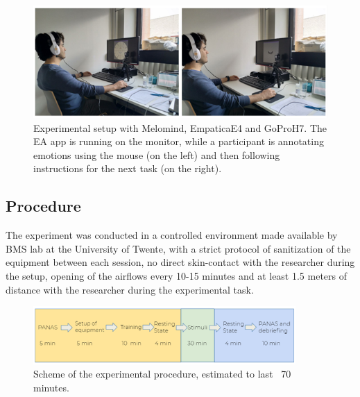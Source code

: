\begin{figure}[h!]
\includegraphics[width=14cm]{img/methods/experimental_setup.png}
\centering
\caption{Experimental setup with Melomind, EmpaticaE4 and GoProH7. The EA app is running on the monitor, while a participant is annotating emotions using the mouse (on the left) and then following instructions for the next task (on the right).} \label{fig_experimental_setup}
\end{figure}

\subsection{Procedure}
\label{sec:procedure}
The experiment was conducted in a controlled environment made available by BMS lab at the University of Twente, with a strict protocol of sanitization of the equipment between each session, no direct skin-contact with the researcher during the setup, opening of the airflows every 10-15 minutes and at least 1.5 meters of distance with the researcher during the experimental task.

\begin{figure}[h!]
\includegraphics[width=10cm]{img/methods/exp_procedure.png}
\centering
\caption{Scheme of the experimental procedure, estimated to last ~70 minutes.} \label{fig_exp_procedure}
\end{figure}

